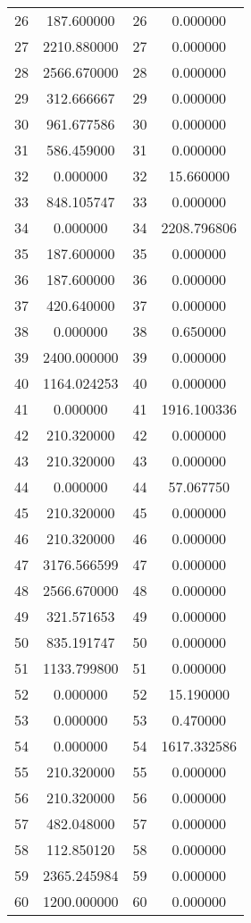 \documentclass[12pt]{article}
\begin{document}
\begin{longtable}{@{}cccc@{}}
26 & 187.600000 & 26 & 0.000000 \\
27 & 2210.880000 & 27 & 0.000000 \\
28 & 2566.670000 & 28 & 0.000000 \\
29 & 312.666667 & 29 & 0.000000 \\
30 & 961.677586 & 30 & 0.000000 \\
31 & 586.459000 & 31 & 0.000000 \\
32 & 0.000000 & 32 & 15.660000 \\
33 & 848.105747 & 33 & 0.000000 \\
34 & 0.000000 & 34 & 2208.796806 \\
35 & 187.600000 & 35 & 0.000000 \\
36 & 187.600000 & 36 & 0.000000 \\
37 & 420.640000 & 37 & 0.000000 \\
38 & 0.000000 & 38 & 0.650000 \\
39 & 2400.000000 & 39 & 0.000000 \\
40 & 1164.024253 & 40 & 0.000000 \\
41 & 0.000000 & 41 & 1916.100336 \\
42 & 210.320000 & 42 & 0.000000 \\
43 & 210.320000 & 43 & 0.000000 \\
44 & 0.000000 & 44 & 57.067750 \\
45 & 210.320000 & 45 & 0.000000 \\
46 & 210.320000 & 46 & 0.000000 \\
47 & 3176.566599 & 47 & 0.000000 \\
48 & 2566.670000 & 48 & 0.000000 \\
49 & 321.571653 & 49 & 0.000000 \\
50 & 835.191747 & 50 & 0.000000 \\
51 & 1133.799800 & 51 & 0.000000 \\
52 & 0.000000 & 52 & 15.190000 \\
53 & 0.000000 & 53 & 0.470000 \\
54 & 0.000000 & 54 & 1617.332586 \\
55 & 210.320000 & 55 & 0.000000 \\
56 & 210.320000 & 56 & 0.000000 \\
57 & 482.048000 & 57 & 0.000000 \\
58 & 112.850120 & 58 & 0.000000 \\
59 & 2365.245984 & 59 & 0.000000 \\
60 & 1200.000000 & 60 & 0.000000 \\

\end{longtable}
\end{document}

